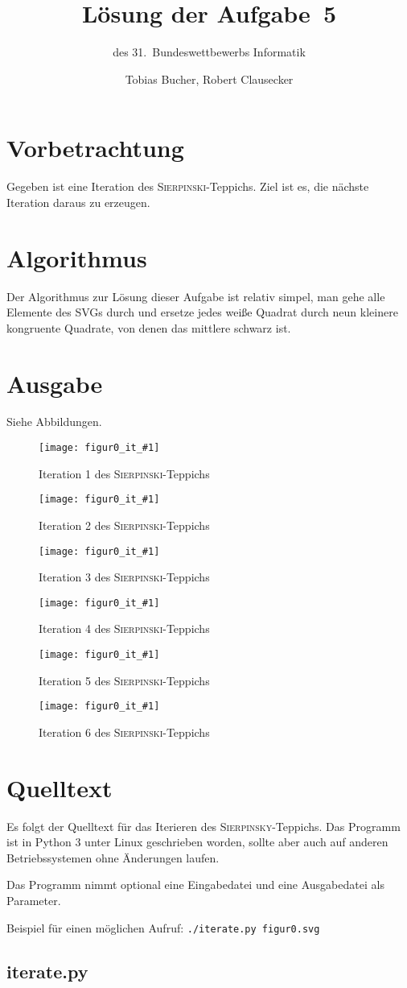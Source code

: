 \documentclass{scrartcl}
\title{Lösung der Aufgabe~5}
\subtitle{des 31.~Bundeswettbewerbs Informatik}
\author{Tobias Bucher, Robert Clausecker}
\newcommand{\src}[1]{\texttt{#1}}
\begin{document}
\maketitle

\section{Vorbetrachtung}
Gegeben ist eine Iteration des \textsc{Sierpinski}-Teppichs. Ziel ist es, die
nächste Iteration daraus zu erzeugen.

\section{Algorithmus}
Der Algorithmus zur Lösung dieser Aufgabe ist relativ simpel, man gehe alle
Elemente des SVGs durch und ersetze jedes weiße Quadrat durch neun kleinere
kongruente Quadrate, von denen das mittlere schwarz ist.

\section{Ausgabe}
Siehe Abbildungen.

\newcommand{\SierpinskyIteration}[1]{%
\begin{figure} %
	\center\texttt{[image: figur0\_it\_\#1]} %
	\caption{Iteration #1 des \textsc{Sierpinski}-Teppichs} %
\end{figure}
}

\SierpinskyIteration{1}
\SierpinskyIteration{2}
\SierpinskyIteration{3}
\SierpinskyIteration{4}
\SierpinskyIteration{5}
\SierpinskyIteration{6}

\newpage\appendix
\section{Quelltext}
Es folgt der Quelltext für das Iterieren des \textsc{Sierpinsky}-Teppichs. Das
Programm ist in Python 3 unter Linux geschrieben worden, sollte aber auch auf
anderen Betriebssystemen ohne Änderungen laufen.

Das Programm nimmt optional eine Eingabedatei und eine Ausgabedatei als
Parameter.

Beispiel für einen möglichen Aufruf: \src{./iterate.py figur0.svg}

\newcommand{\InputSource}[1]{\subsection*{#1.py}}

\InputSource{iterate}
\end{document}
